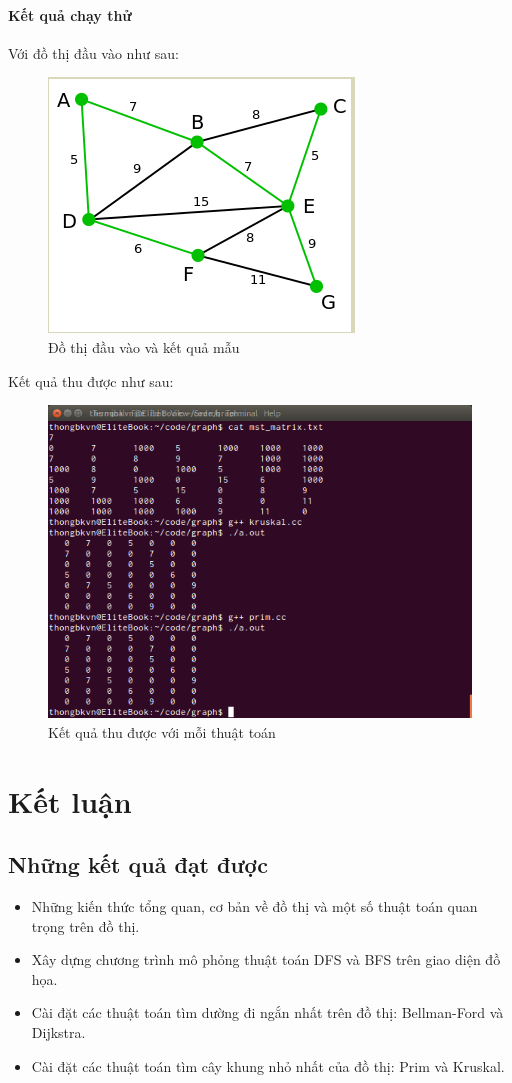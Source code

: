 \documentclass[a4paper,10pt]{article}
\begin{document}
\paragraph{Kết quả chạy thử}
Với đồ thị đầu vào như sau:
\begin{figure}[h!]
  \centering
  \includegraphics[scale=0.5]{images/pic9.png}
  \caption{Đồ thị đầu vào và kết quả mẫu}
\end{figure}

Kết quả thu được như sau:
\begin{figure}[h!]
  \centering
  \includegraphics[scale=0.5]{images/pic10.png}
  \caption{Kết quả thu được với mỗi thuật toán}
\end{figure}


\section{Kết luận}
\subsection{Những kết quả đạt được}
\begin{itemize}
\item Những kiến thức tổng quan, cơ bản về đồ thị và một số thuật toán quan trọng trên đồ thị.
\item Xây dựng chương trình mô phỏng thuật toán DFS và BFS trên giao diện đồ họa.
\item Cài đặt các thuật toán tìm dường đi ngắn nhất trên đồ thị: Bellman-Ford và Dijkstra.
\item Cài đặt các thuật toán tìm cây khung nhỏ nhất của đồ thị: Prim và Kruskal.
\end{itemize}
\end{document}
